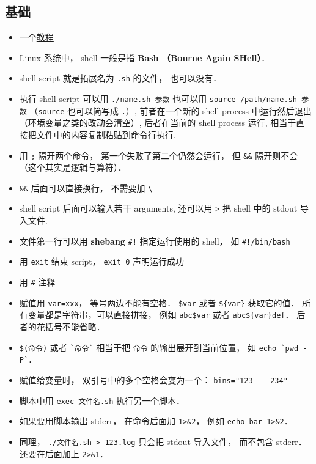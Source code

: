 
\begin{issues}
\issueDraft
\end{issues}


\subsection{基础}
\begin{itemize}
\item 一个\href{https://tldp.org/LDP/abs/html/why-shell.html}{教程}
\item Linux 系统中， shell 一般是指 \textbf{Bash （Bourne Again SHell）}．
\item shell script 就是拓展名为 \verb`.sh` 的文件， 也可以没有．
\item 执行 shell script 可以用 \verb`./name.sh 参数` 也可以用 \verb`source /path/name.sh 参数` （\verb|source| 也可以简写成 \verb|.|）, 前者在一个新的 shell process 中运行然后退出（环境变量之类的改动会清空）, 后者在当前的 shell process 运行, 相当于直接把文件中的内容复制粘贴到命令行执行.
\item 用 \verb|;| 隔开两个命令， 第一个失败了第二个仍然会运行， 但 \verb|&&| 隔开则不会（这个其实是逻辑与算符）．
\item \verb|&&| 后面可以直接换行， 不需要加 \verb|\|
\item shell script 后面可以输入若干 arguments, 还可以用 \verb`>` 把 shell 中的 stdout 导入文件.
\item 文件第一行可以用 \textbf{shebang} \verb`#!` 指定运行使用的 shell， 如 \verb`#!/bin/bash`
\item 用 \verb|exit| 结束 script， \verb`exit 0` 声明运行成功
\item 用 \verb`#` 注释
\item 赋值用 \verb`var=xxx`， 等号两边不能有空格． \verb|$var| 或者 \verb|${var}| 获取它的值． 所有变量都是字符串，可以直接拼接， 例如 \verb|abc$var| 或者 \verb|abc${var}def|． 后者的花括号不能省略．
\item \verb|$(命令)| 或者 \verb|`命令`| 相当于把 \verb|命令| 的输出展开到当前位置， 如 \verb|echo `pwd -P`|．
\item 赋值给变量时， 双引号中的多个空格会变为一个： \verb|bins="123    234"|
\item 脚本中用 \verb|exec 文件名.sh| 执行另一个脚本．
\item 如果要用脚本输出 stderr， 在命令后面加 \verb|1>&2|， 例如 \verb|echo bar 1>&2|．
\item 同理， \verb|./文件名.sh > 123.log| 只会把 stdout 导入文件， 而不包含 stderr． 还要在后面加上 \verb|2>&1|．
\end{itemize}

